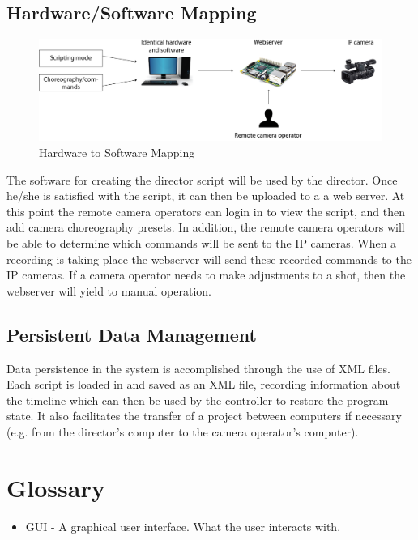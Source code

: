 \documentclass[11pt,twoside,a4paper]{article}
\begin{document}
\subsection{Hardware/Software Mapping}
\begin{figure}[H]
	\centering
	\includegraphics[width=\textwidth]{HWsoftwaremapping}
	\caption{Hardware to Software Mapping}
	\label{fig:mapping}
\end{figure}

The software for creating the director script will be used by the director. Once he/she is satisfied with the script, it can then be uploaded to a a web server. At this point the remote camera operators can login in to view the script, and then add camera choreography presets. In addition, the remote camera operators will be able to determine which commands will be sent to the IP cameras. When a recording is taking place the webserver will send these recorded commands to the IP cameras. If a camera operator needs to make adjustments to a shot, then the webserver will yield to manual operation.

\subsection{Persistent Data Management}
Data persistence in the system is accomplished through the use of XML files. Each script is loaded in and saved as an XML file, recording information about the timeline which can then be used by the controller to restore the program state. It also facilitates the transfer of a project between computers if necessary (e.g. from the director's computer to the camera operator's computer).

\section{Glossary}
\begin{itemize}
  \item GUI - A graphical user interface. What the user interacts with.
\end{itemize}
\end{document}
